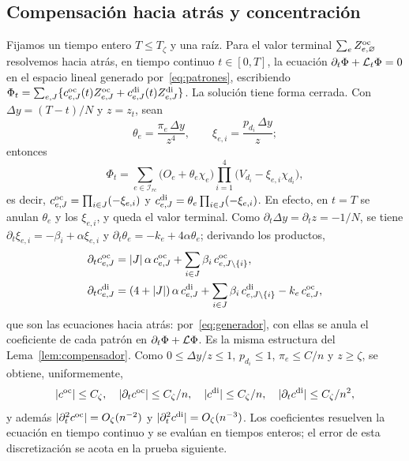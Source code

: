 \subsection{Compensación hacia atrás y concentración}

Fijamos un tiempo entero $T\le T_\zeta$ y una raíz. Para el valor terminal
$\sum_eZ^{\mathrm{oc}}_{e,\varnothing}$ resolvemos hacia atrás, en tiempo continuo $t\in[0,T]$, la ecuación
$\partial_t\Phi+\mathcal{L}_t\Phi=0$ en el espacio lineal generado por~\eqref{eq:patrones}, escribiendo
$\Phi_t=\sum_{e,J}\{c^{\mathrm{oc}}_{e,J}(t)Z^{\mathrm{oc}}_{e,J}+c^{\mathrm{di}}_{e,J}(t)Z^{\mathrm{di}}_{e,J}\}$. La solución tiene forma
cerrada. Con $\Delta y=(T-t)/N$ y $z=z_t$, sean
\[
 \theta_e=\frac{\pi_e\,\Delta y}{z^4},\qquad \xi_{e,i}=\frac{p_{d_i}\,\Delta y}{z};
\]
entonces
\begin{equation}\label{eq:compensador_directo}
 \Phi_t=\sum_{e\in\mathcal I_{rc}}\bigl(O_e+\theta_e\chi_e\bigr)
 \prod_{i=1}^4\bigl(V_{d_i}-\xi_{e,i}\chi_{d_i}\bigr),
\end{equation}
es decir, $c^{\mathrm{oc}}_{e,J}=\prod_{i\in J}(-\xi_{e,i})$ y $c^{\mathrm{di}}_{e,J}=\theta_e\prod_{i\in J}(-\xi_{e,i})$.
En efecto, en $t=T$ se anulan $\theta_e$ y los $\xi_{e,i}$, y queda el valor terminal. Como
$\partial_t\Delta y=\partial_tz=-1/N$, se tiene $\partial_t\xi_{e,i}=-\beta_i+\alpha\xi_{e,i}$ y
$\partial_t\theta_e=-k_e+4\alpha\theta_e$; derivando los productos,
\[
\begin{aligned}
 \partial_tc^{\mathrm{oc}}_{e,J}&=|J|\,\alpha\,c^{\mathrm{oc}}_{e,J}+\sum_{i\in J}\beta_i\,c^{\mathrm{oc}}_{e,J\setminus\{i\}},\\
 \partial_tc^{\mathrm{di}}_{e,J}&=(4+|J|)\,\alpha\,c^{\mathrm{di}}_{e,J}+\sum_{i\in J}\beta_i\,c^{\mathrm{di}}_{e,J\setminus\{i\}}
 -k_e\,c^{\mathrm{oc}}_{e,J},
\end{aligned}
\]
que son las ecuaciones hacia atrás: por~\eqref{eq:generador}, con ellas se anula el coeficiente de
cada patrón en $\partial_t\Phi+\mathcal{L}\Phi$. Es la misma estructura del Lema~\ref{lem:compensador}. Como
$0\le\Delta y/z\le1$, $p_{d_i}\le1$, $\pi_e\le C/n$ y $z\ge\zeta$, se obtiene, uniformemente,
\begin{equation}\label{eq:coeficientes}
 |c^{\mathrm{oc}}|\le C_\zeta,\quad |\partial_tc^{\mathrm{oc}}|\le C_\zeta/n,\quad |c^{\mathrm{di}}|\le C_\zeta/n,\quad
 |\partial_tc^{\mathrm{di}}|\le C_\zeta/n^2,
\end{equation}
y además $|\partial_t^2c^{\mathrm{oc}}|=O_\zeta(n^{-2})$ y $|\partial_t^2c^{\mathrm{di}}|=O_\zeta(n^{-3})$. Los
coeficientes resuelven la ecuación en tiempo continuo y se evalúan en tiempos enteros; el error
de esta discretización se acota en la prueba siguiente.

